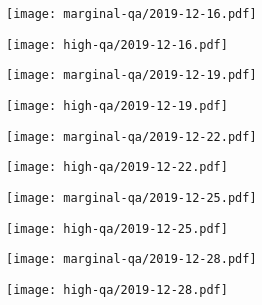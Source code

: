 \documentclass{article}
\begin{document}
\begin{figure}[H]
	\ContinuedFloat
	\centering
	\begin{subfigure}{0.48\linewidth}
		\texttt{[image: marginal-qa/2019-12-16.pdf]}
	\end{subfigure}
	\begin{subfigure}{0.48\linewidth}
		\texttt{[image: high-qa/2019-12-16.pdf]}
	\end{subfigure}
	\begin{subfigure}{0.48\linewidth}
		\texttt{[image: marginal-qa/2019-12-19.pdf]}
	\end{subfigure}
	\begin{subfigure}{0.48\linewidth}
		\texttt{[image: high-qa/2019-12-19.pdf]}
	\end{subfigure}
	\begin{subfigure}{0.48\linewidth}
		\texttt{[image: marginal-qa/2019-12-22.pdf]}
	\end{subfigure}
	\begin{subfigure}{0.48\linewidth}
		\texttt{[image: high-qa/2019-12-22.pdf]}
	\end{subfigure}
	\begin{subfigure}{0.48\linewidth}
		\texttt{[image: marginal-qa/2019-12-25.pdf]}
	\end{subfigure}
	\begin{subfigure}{0.48\linewidth}
		\texttt{[image: high-qa/2019-12-25.pdf]}
	\end{subfigure}
	\begin{subfigure}{0.48\linewidth}
		\texttt{[image: marginal-qa/2019-12-28.pdf]}
	\end{subfigure}
	\begin{subfigure}{0.48\linewidth}
		\texttt{[image: high-qa/2019-12-28.pdf]}
	\end{subfigure}
\end{figure}
\end{document}
